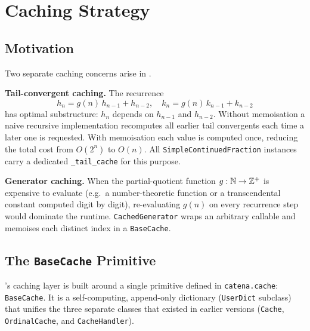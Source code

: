 \section{Caching Strategy}

\subsection{Motivation}

Two separate caching concerns arise in \catena.

\textbf{Tail-convergent caching.}  The recurrence
\[
    h_n = g(n)\,h_{n-1} + h_{n-2}, \quad k_n = g(n)\,k_{n-1} + k_{n-2}
\]
has optimal substructure: $h_n$ depends on $h_{n-1}$ and $h_{n-2}$.
Without memoisation a naive recursive implementation recomputes all earlier
tail convergents each time a later one is requested.  With memoisation each
value is computed once, reducing the total cost from $O(2^n)$ to $O(n)$.
All \texttt{SimpleContinuedFraction} instances carry a dedicated
\texttt{\_tail\_cache} for this purpose.

\textbf{Generator caching.}  When the partial-quotient function $g: \mathbb{N} \to \mathbb{Z}^+$
is expensive to evaluate (e.g.\ a number-theoretic function or a transcendental
constant computed digit by digit), re-evaluating $g(n)$ on every recurrence step
would dominate the runtime.  \texttt{CachedGenerator} wraps an arbitrary callable
and memoises each distinct index in a \texttt{BaseCache}.

\subsection{The \texttt{BaseCache} Primitive}

\catena's caching layer is built around a single primitive defined in
\texttt{catena.cache}: \texttt{BaseCache}.  It is a self-computing,
append-only dictionary (\texttt{UserDict} subclass) that unifies the three
separate classes that existed in earlier versions (\texttt{Cache},
\texttt{OrdinalCache}, and \texttt{CacheHandler}).

